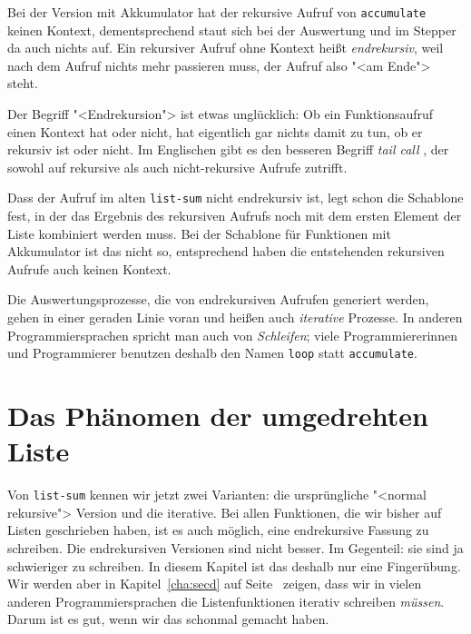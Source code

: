 Bei der Version mit Akkumulator hat der rekursive Aufruf von
\lstinline{accumulate} keinen Kontext, dementsprechend staut sich bei
der Auswertung und im Stepper da auch nichts auf.  Ein rekursiver
Aufruf ohne Kontext heißt \textit{endrekursiv},
weil nach dem Aufruf nichts mehr passieren muss, der Aufruf also "<am
Ende"> steht.

Der Begriff "<Endrekursion"> ist etwas unglücklich: Ob ein
Funktionsaufruf einen Kontext hat oder nicht, hat eigentlich gar
nichts damit zu tun, ob er rekursiv ist oder nicht.  Im Englischen
gibt es den besseren Begriff \textit{tail call}
, der sowohl auf rekursive
als auch nicht-rekursive Aufrufe zutrifft.

Dass der Aufruf im alten \lstinline{list-sum} nicht endrekursiv ist,
legt schon die Schablone fest, in der das Ergebnis des rekursiven
Aufrufs noch mit dem ersten Element der Liste kombiniert werden muss.
Bei der Schablone für Funktionen mit Akkumulator ist das nicht so,
entsprechend haben die entstehenden rekursiven Aufrufe auch keinen
Kontext.

Die Auswertungsprozesse, die von endrekursiven Aufrufen generiert
werden, gehen in einer geraden Linie voran und heißen auch
\textit{iterative} Prozesse.  In anderen
Programmiersprachen spricht man auch von
\textit{Schleifen}; viele Programmiererinnen und
Programmierer benutzen deshalb den Namen \lstinline{loop} statt
\lstinline{accumulate}.

\section{Das Phänomen der umgedrehten Liste}
\label{sec:umgedrehte-liste}

Von \lstinline{list-sum} kennen wir jetzt zwei Varianten: die
ursprüngliche "<normal rekursive"> Version und die iterative.  Bei
allen Funktionen, die wir bisher auf Listen geschrieben haben, ist es
auch möglich, eine endrekursive Fassung zu schreiben.  Die
endrekursiven Versionen sind nicht besser.  Im Gegenteil: sie sind ja
schwieriger zu schreiben.  In diesem Kapitel ist das deshalb nur eine
Fingerübung.  Wir werden aber in Kapitel~\ref{cha:secd} auf
Seite~\pageref{cha:secd} zeigen, dass wir in vielen anderen
Programmiersprachen die Listenfunktionen iterativ schreiben
\emph{müssen}.  Darum ist es gut, wenn wir das schonmal gemacht haben.

